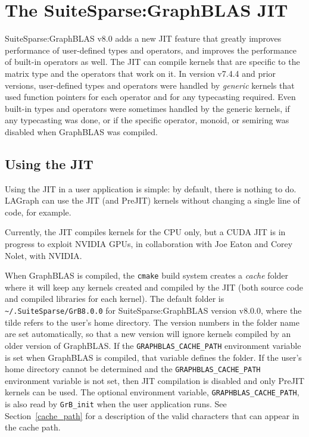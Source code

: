 

\newpage
\section{The SuiteSparse:GraphBLAS JIT} %
\label{jit}

SuiteSparse:GraphBLAS v8.0 adds a new JIT feature that greatly improves
performance of user-defined types and operators, and improves the performance
of built-in operators as well.  The JIT can compile kernels that are specific
to the matrix type and the operators that work on it.  In version v7.4.4 and
prior versions, user-defined types and operators were handled by {\em generic}
kernels that used function pointers for each operator and for any typecasting
required.  Even built-in types and operators were sometimes handled by the
generic kernels, if any typecasting was done, or if the specific operator,
monoid, or semiring was disabled when GraphBLAS was compiled.

\subsection{Using the JIT}

Using the JIT in a user application is simple:  by default, there is nothing to
do.  LAGraph can use the JIT (and PreJIT) kernels without changing a single
line of code, for example.

Currently, the JIT compiles kernels for the CPU only, but a CUDA JIT is in
progress to exploit NVIDIA GPUs, in collaboration with Joe Eaton and
Corey Nolet, with NVIDIA.

When GraphBLAS is compiled, the \verb'cmake' build system creates a {\em cache}
folder where it will keep any kernels created and compiled by the JIT
(both source code and compiled libraries for each kernel).  The
default folder is \verb'~/.SuiteSparse/GrB8.0.0' for SuiteSparse:GraphBLAS
version v8.0.0, where the tilde refers to the user's home directory.
The version numbers in the folder name are set automatically, so that a new
version will ignore kernels compiled by an older version of GraphBLAS.  If the
\verb'GRAPHBLAS_CACHE_PATH' environment variable is set when GraphBLAS is
compiled, that variable defines the folder.  If the user's home directory
cannot be determined and the \verb'GRAPHBLAS_CACHE_PATH' environment variable
is not set, then JIT compilation is disabled and only PreJIT kernels can be
used.  The optional environment variable, \verb'GRAPHBLAS_CACHE_PATH', is also
read by \verb'GrB_init' when the user application runs.  See
Section~\ref{cache_path} for a description of the valid characters that can
appear in the cache path.

